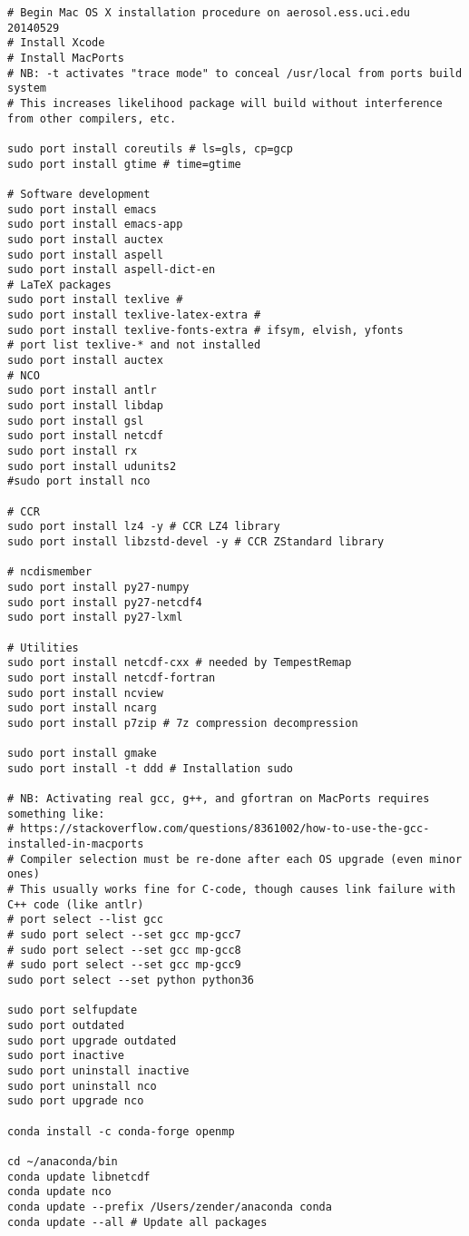 \documentclass[12pt,twoside]{article}
\begin{document}
\begin{verbatim}
# Begin Mac OS X installation procedure on aerosol.ess.uci.edu 20140529
# Install Xcode
# Install MacPorts
# NB: -t activates "trace mode" to conceal /usr/local from ports build system
# This increases likelihood package will build without interference from other compilers, etc.

sudo port install coreutils # ls=gls, cp=gcp
sudo port install gtime # time=gtime

# Software development
sudo port install emacs
sudo port install emacs-app
sudo port install auctex
sudo port install aspell
sudo port install aspell-dict-en
# LaTeX packages
sudo port install texlive # 
sudo port install texlive-latex-extra # 
sudo port install texlive-fonts-extra # ifsym, elvish, yfonts
# port list texlive-* and not installed
sudo port install auctex
# NCO
sudo port install antlr
sudo port install libdap
sudo port install gsl
sudo port install netcdf
sudo port install rx
sudo port install udunits2
#sudo port install nco

# CCR
sudo port install lz4 -y # CCR LZ4 library
sudo port install libzstd-devel -y # CCR ZStandard library

# ncdismember
sudo port install py27-numpy
sudo port install py27-netcdf4
sudo port install py27-lxml

# Utilities
sudo port install netcdf-cxx # needed by TempestRemap
sudo port install netcdf-fortran
sudo port install ncview
sudo port install ncarg
sudo port install p7zip # 7z compression decompression

sudo port install gmake
sudo port install -t ddd # Installation sudo

# NB: Activating real gcc, g++, and gfortran on MacPorts requires something like:
# https://stackoverflow.com/questions/8361002/how-to-use-the-gcc-installed-in-macports
# Compiler selection must be re-done after each OS upgrade (even minor ones)
# This usually works fine for C-code, though causes link failure with C++ code (like antlr)
# port select --list gcc
# sudo port select --set gcc mp-gcc7
# sudo port select --set gcc mp-gcc8
# sudo port select --set gcc mp-gcc9
sudo port select --set python python36

sudo port selfupdate
sudo port outdated
sudo port upgrade outdated
sudo port inactive
sudo port uninstall inactive
sudo port uninstall nco
sudo port upgrade nco

conda install -c conda-forge openmp

cd ~/anaconda/bin
conda update libnetcdf
conda update nco
conda update --prefix /Users/zender/anaconda conda
conda update --all # Update all packages


\end{verbatim}
\end{document}
